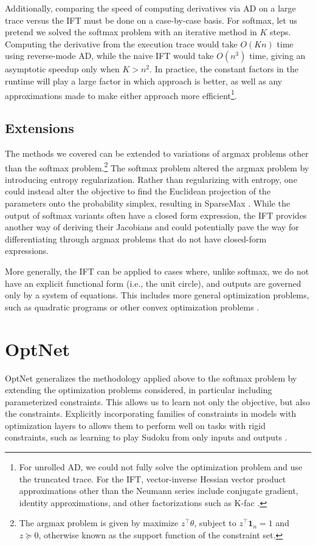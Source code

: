 \documentclass[11pt]{article}
\begin{document}
Additionally, comparing the speed of computing derivatives via AD on a large trace versus the IFT
must be done on a case-by-case basis.
For softmax, let us pretend we solved the softmax problem with an iterative method in $K$ steps.
Computing the derivative from the execution trace would take $O(Kn)$ time using reverse-mode AD,
while the naive IFT would take $O(n^3)$ time, giving an asymptotic speedup only when $K > n^2$.
In practice, the constant factors in the runtime will play a large factor in which approach
is better, as well as any approximations made to make either approach more efficient\footnote{
For unrolled AD, we could not fully solve the optimization problem and use the truncated trace.
For the IFT, vector-inverse Hessian vector product approximations other than the Neumann series
include conjugate gradient, identity approximations, and other factorizations such as K-fac
\citep{kfac}.
}.


\subsection{Extensions}
The methods we covered can be extended to variations of argmax problems
other than the softmax problem.\footnote{
The argmax problem is given by maximize $z^\top \theta$, subject to $z^\top\mathbf{1}_n=1$
and $z\succeq 0$, otherwise known as the support function of the constraint set.
}
The softmax problem altered the argmax problem by introducing entropy regularization.
Rather than regularizing with entropy, one could instead alter the objective to find
the Euclidean projection of the parameters onto the probability simplex,
resulting in SparseMax \citep{sparsemax}.
While the output of softmax variants often have a closed form expression,
the IFT provides another way of deriving their Jacobians
and could potentially pave the way for differentiating through argmax problems
that do not have closed-form expressions.

More generally, the IFT can be applied to cases where, unlike softmax,
we do not have an explicit functional form (i.e., the unit circle),
and outputs are governed only by a system of equations.
This includes more general optimization problems, such as quadratic programs \citep{optnet}
or other convex optimization problems \citep{agrawal2019diffcvx}.

\section{OptNet}
\label{sec:optnet}
OptNet generalizes the methodology applied above to the softmax problem by
extending the optimization problems considered,
in particular including parameterized constraints.
This allows us to learn not only the objective, but also the constraints.
Explicitly incorporating families of constraints in models
with optimization layers to allows them to perform well
on tasks with rigid constraints, such as learning to play
Sudoku from only inputs and outputs \citep{optnet}.
\end{document}
